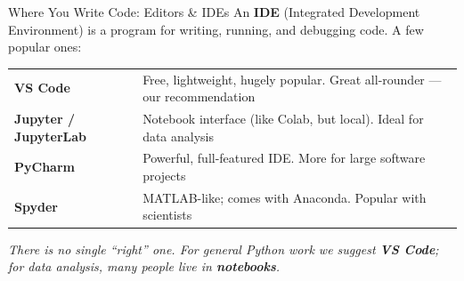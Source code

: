 \documentclass[aspectratio=169]{beamer}
\begin{document}
\begin{frame}{Where You Write Code: Editors \& IDEs}
\vspace{0.2cm}
{\small An \textbf{IDE} (Integrated Development Environment) is a program for writing, running,
and debugging code. A few popular ones:}

\medskip
\begin{center}
\renewcommand{\arraystretch}{1.35}
{\small
\begin{tabular}{p{2.7cm}|p{9.3cm}}
\textbf{VS Code} & Free, lightweight, hugely popular. Great all-rounder --- our recommendation \\
\textbf{Jupyter / JupyterLab} & Notebook interface (like Colab, but local). Ideal for data analysis \\
\textbf{PyCharm} & Powerful, full-featured IDE. More for large software projects \\
\textbf{Spyder} & MATLAB-like; comes with Anaconda. Popular with scientists \\
\end{tabular}
}
\end{center}

\medskip
{\small\textcolor{midgray}{\textit{There is no single ``right'' one. For general Python work
we suggest \textbf{VS Code}; for data analysis, many people live in \textbf{notebooks}.}}}
\end{frame}
\end{document}
